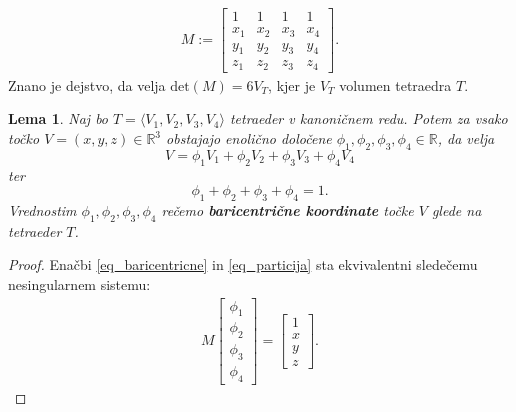 \documentclass[11pt,a4paper]{article}
\newtheorem{lemma}{Lema}
\begin{document}
\begin{align}
    M := \begin{bmatrix}
        1 & 1 & 1 & 1 \\
        x_1 & x_2 & x_3 & x_4 \\
        y_1 & y_2 & y_3 & y_4 \\
        z_1 & z_2 & z_3 & z_4
    \end{bmatrix}.
\end{align}
Znano je dejstvo, da velja $\text{det}(M) = 6V_T$, kjer je $V_T$ volumen tetraedra $T$. 


\begin{lemma}\label{lema_baricentricne}
    Naj bo $T = \langle V_1, V_2, V_3, V_4 \rangle$ tetraeder v kanoničnem redu.
    Potem za vsako točko $V = (x,y,z) \in \mathbb{R}^3$ obstajajo enolično določene
     $\phi_1, \phi_2, \phi_3, \phi_4 \in \mathbb{R}$,
    da velja 
    \begin{equation}\label{eq_baricentricne}
        V = \phi_1 V_1 + \phi_2 V_2 + \phi_3 V_3 + \phi_4 V_4
    \end{equation} ter 
    \begin{equation}\label{eq_particija}
        \phi_1 + \phi_2 + \phi_3 + \phi_4 = 1 .
    \end{equation}
    Vrednostim $\phi_1, \phi_2, \phi_3, \phi_4$ rečemo \textbf{baricentrične 
    koordinate} točke $V$ glede na tetraeder $T$.
\end{lemma}

\begin{proof}
    Enačbi \ref{eq_baricentricne} in \ref{eq_particija} sta ekvivalentni
    sledečemu nesingularnem sistemu:
    \begin{align}
        M \begin{bmatrix}\phi_1 \\ \phi_2 \\ \phi_3 \\ \phi_4 \end{bmatrix} = \begin{bmatrix}
            1 \\ x \\ y \\ z \end{bmatrix}.
    \end{align}
\end{proof}
\end{document}

